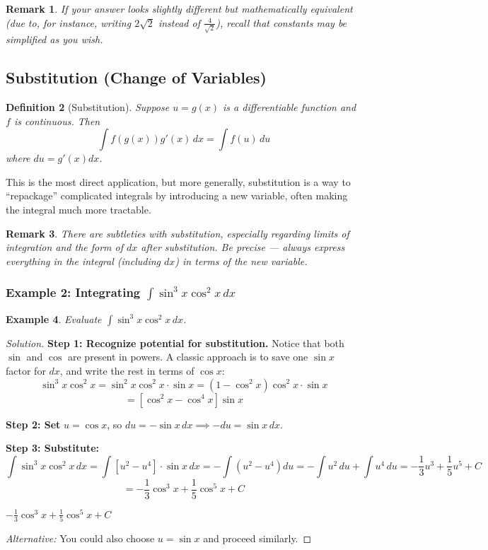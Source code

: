 \documentclass[11pt]{article}
\newtheorem{definition}{Definition}[section]
\newtheorem{example}[definition]{Example}
\newtheorem{remark}[definition]{Remark}
\theoremstyle{definition}
\begin{document}
\begin{remark}
If your answer looks slightly different but mathematically equivalent (due to, for instance, writing $2\sqrt{2}$ instead of $\frac{4}{\sqrt{2}}$), recall that constants may be simplified as you wish.
\end{remark}

\subsection{Substitution (Change of Variables)}

\begin{definition}[Substitution]
Suppose $u = g(x)$ is a differentiable function and $f$ is continuous. Then
\[
    \int f(g(x)) g'(x)\, dx = \int f(u)\, du
\]
where $du = g'(x)dx$.
\end{definition}
This is the most direct application, but more generally, substitution is a way to ``repackage'' complicated integrals by introducing a new variable, often making the integral much more tractable.

\begin{remark}
There are subtleties with substitution, especially regarding limits of integration and the form of $dx$ after substitution. Be precise — always express everything in the integral (including $dx$) in terms of the new variable.
\end{remark}

\subsubsection*{Example 2: Integrating $\int \sin^3 x \cos^2 x\, dx$}

\begin{example}\label{ex:sin3cos2}
Evaluate $\displaystyle \int \sin^3 x \cos^2 x\, dx$.
\end{example}

\begin{proof}[Solution]
\textbf{Step 1: Recognize potential for substitution.} Notice that both $\sin$ and $\cos$ are present in powers. A classic approach is to save one $\sin x$ factor for $dx$, and write the rest in terms of $\cos x$:
\[
\sin^3 x \cos^2 x = \sin^2 x \cos^2 x \cdot \sin x = (1 - \cos^2 x) \cos^2 x \cdot \sin x
\]
\[
= [\cos^2 x - \cos^4 x] \sin x
\]

\textbf{Step 2: Set} $u = \cos x$, so $du = -\sin x\, dx \implies -du = \sin x\, dx$.

\textbf{Step 3: Substitute:}
\[
\int \sin^3 x \cos^2 x\, dx
= \int [u^2 - u^4] \cdot \sin x\, dx
= -\int (u^2 - u^4) du
= -\int u^2\, du + \int u^4\, du
= -\frac{1}{3} u^3 + \frac{1}{5} u^5 + C
\]
\[
= -\frac{1}{3} \cos^3 x + \frac{1}{5} \cos^5 x + C
\]

\begin{flushright}
    $\boxed{-\frac{1}{3} \cos^3 x + \frac{1}{5} \cos^5 x + C}$
\end{flushright}

\textit{Alternative:} You could also choose $u = \sin x$ and proceed similarly.
\end{proof}
\end{document}
